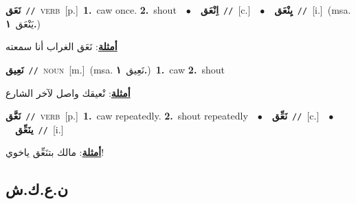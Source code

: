 \documentclass[10pt,a4paper,twoside]{article} %
\begin{document}
\begin{multicols}{2}
{\setlength\topsep{0pt}\textbf{\foreignlanguage{arabic}{نَعَق}}\ {\color{gray}\texttt{//}\color{black}}\ \textsc{verb}\ [p.]\ \textbf{1.}~caw once.  \textbf{2.}~shout\ \ $\bullet$\ \ \setlength\topsep{0pt}\textbf{\foreignlanguage{arabic}{اِنْعَق}}\ {\color{gray}\texttt{//}\color{black}}\ [c.]\ \ $\bullet$\ \ \setlength\topsep{0pt}\textbf{\foreignlanguage{arabic}{يِنْعَق}}\ {\color{gray}\texttt{//}\color{black}}\ [i.]\ \color{gray}(msa. \foreignlanguage{arabic}{يَنْعَق}~\foreignlanguage{arabic}{\textbf{١.}})\color{black}\  \begin{flushright}\color{gray}\foreignlanguage{arabic}{\textbf{\underline{\foreignlanguage{arabic}{أمثلة}}}: نَعَق الغراب أنا سمعته}\end{flushright}\color{black}} \vspace{2mm}

{\setlength\topsep{0pt}\textbf{\foreignlanguage{arabic}{نَعِيق}}\ {\color{gray}\texttt{//}\color{black}}\ \textsc{noun}\ [m.]\ \color{gray}(msa. \foreignlanguage{arabic}{نَعِيق}~\foreignlanguage{arabic}{\textbf{١.}})\color{black}\ \textbf{1.}~caw  \textbf{2.}~shout\  \begin{flushright}\color{gray}\foreignlanguage{arabic}{\textbf{\underline{\foreignlanguage{arabic}{أمثلة}}}: نْعيقك واصل لآخر الشارع}\end{flushright}\color{black}} \vspace{2mm}

{\setlength\topsep{0pt}\textbf{\foreignlanguage{arabic}{نَعَّق}}\ {\color{gray}\texttt{//}\color{black}}\ \textsc{verb}\ [p.]\ \textbf{1.}~caw repeatedly.  \textbf{2.}~shout repeatedly\ \ $\bullet$\ \ \setlength\topsep{0pt}\textbf{\foreignlanguage{arabic}{نَعِّق}}\ {\color{gray}\texttt{//}\color{black}}\ [c.]\ \ $\bullet$\ \ \setlength\topsep{0pt}\textbf{\foreignlanguage{arabic}{ينَعِّق}}\ {\color{gray}\texttt{//}\color{black}}\ [i.]\  \begin{flushright}\color{gray}\foreignlanguage{arabic}{\textbf{\underline{\foreignlanguage{arabic}{أمثلة}}}: مالك بتنَعِّق ياخوي!}\end{flushright}\color{black}} \vspace{2mm}

\vspace{-3mm}
\subsection*{\color{blue}\foreignlanguage{arabic}{ن.ع.ك.ش}\color{blue}{}} 


\end{multicols}
\end{document}
